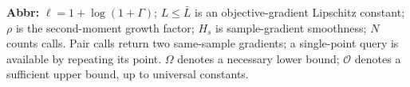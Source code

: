\begin{table}[tp]
\begin{threeparttable}
\begin{tabularx}{\linewidth}{@{}>{\raggedright\arraybackslash}p{0.20\linewidth}>{\raggedright\arraybackslash}p{0.32\linewidth}>{\raggedright\arraybackslash}p{0.25\linewidth}>{\raggedright\arraybackslash}X@{}}
\end{tabularx}
\begin{tablenotes}[flushleft]\footnotesize
\item[] \textbf{Abbr:} $\ell=1+\log(1+\Gamma)$; $L\le\bar L$ is an objective-gradient Lipschitz constant; $\rho$ is the second-moment growth factor; $H_s$ is sample-gradient smoothness; $N$ counts calls. Pair calls return two same-sample gradients; a single-point query is available by repeating its point. $\Omega$ denotes a necessary lower bound; $\mathcal{O}$ denotes a sufficient upper bound, up to universal constants.
\end{tablenotes}
\end{threeparttable}
\end{table}
\clearpage
